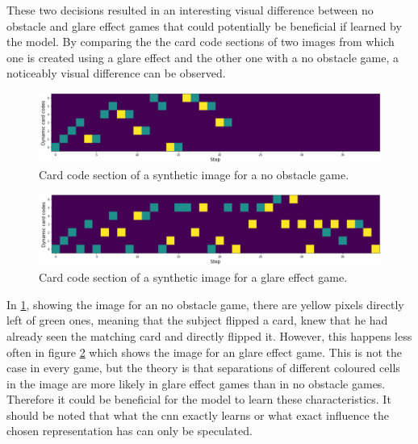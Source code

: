 These two decisions resulted in an interesting visual difference between no obstacle and glare effect games that could potentially be beneficial if learned by the model. By comparing the the card code sections of two images from which one is created using a glare effect and the other one with a no obstacle game, a noticeably visual difference can be observed. 
\begin{figure}[H]
	\centering
	\includegraphics[width=15cm]{images/cardCodesNoObst.png}
	\caption[Bild kurz]{Card code section of a synthetic image for a no obstacle game.}
	\label{fig:ccNoObst}
\end{figure}
\begin{figure}[H]
	\centering
	\includegraphics[width=15cm]{images/cardCodesGlare.png}
	\caption[Bild kurz]{Card code section of a synthetic image for a glare effect game.}
	\label{fig:ccGlareEffect}
\end{figure}
In \ref{fig:ccNoObst}, showing the image for an no obstacle game, there are yellow pixels directly left of green ones, meaning that the subject flipped a card, knew that he had already seen the matching card and directly flipped it. However, this happens less often in figure \ref{fig:ccGlareEffect} which shows the image for an glare effect game. This is not the case in every game, but the theory is that separations of different coloured cells in the image are more likely in glare effect games than in no obstacle games. Therefore it could be beneficial for the model to learn these characteristics. It should be noted that what the cnn exactly learns or what exact influence the chosen representation has can only be speculated. 


